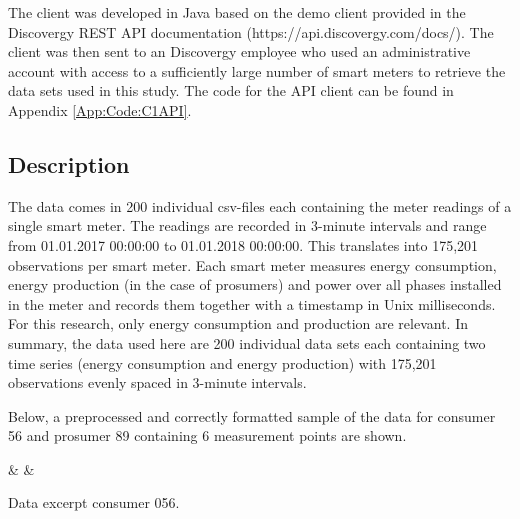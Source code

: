 The client was developed in Java based on the demo client provided in the Discovergy REST API documentation (https://api.discovergy.com/docs/). The client was then sent to an Discovergy employee who used an administrative account with access to a sufficiently large number of smart meters to retrieve the data sets used in this study. The code for the API client can be found in Appendix \ref{App:Code:C1API}.


\subsection{Description}\label{Sec:Data;Subsec:Description}

The data comes in 200 individual csv-files each containing the meter readings of a single smart meter. The readings are recorded in 3-minute intervals and range from 01.01.2017 00:00:00 to 01.01.2018 00:00:00. This translates into 175,201 observations per smart meter. Each smart meter measures energy consumption,  energy production (in the case of prosumers) and power over all phases installed in the meter and records them together with a timestamp in Unix milliseconds. For this research, only energy consumption and production are relevant. In summary, the data used here are 200 individual data sets each containing two time series (energy consumption and energy production) with 175,201 observations evenly spaced in 3-minute intervals.

Below, a preprocessed and correctly formatted sample of the data for consumer 56 and prosumer 89 containing 6 measurement points are shown.

\begin{table}[h]
    {\csvcolii & \csvcoliii & \csvcoliv}%
    \caption[Data excerpt consumer 056]{Data excerpt consumer 056. \quantnet}
\end{table}

